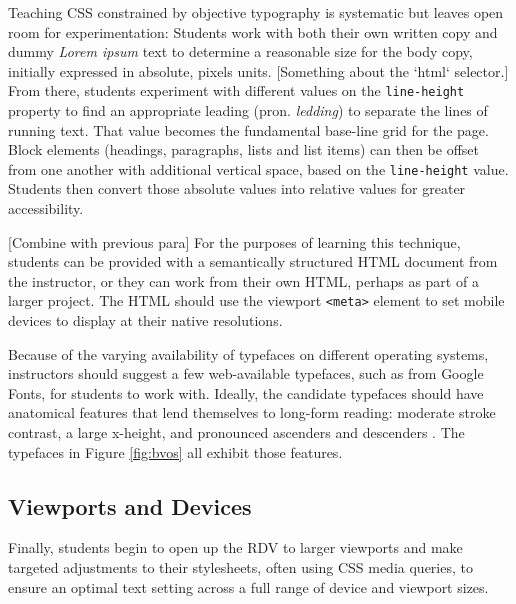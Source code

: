 \documentclass[sigplan,screen]{acmart}
\begin{document}
Teaching CSS constrained by objective typography is systematic but leaves open room for experimentation: Students work with both their own written copy and dummy {\itshape Lorem ipsum} text to determine a reasonable size for the body copy, initially expressed in absolute, pixels units. [Something about the `html` selector.] From there, students experiment with different values on the \verb|line-height| property to find an appropriate leading (pron. {\itshape ledding}) to separate the lines of running text. That value becomes the fundamental base-line grid for the page. Block elements (headings, paragraphs, lists and list items) can then be offset from one another with additional vertical space, based on the \verb|line-height| value. Students then convert those absolute values into relative values for greater accessibility.

[Combine with previous para] For the purposes of learning this technique, students can be provided with a semantically structured HTML document from the instructor, or they can work from their own HTML, perhaps as part of a larger project. The HTML should use the viewport \verb|<meta>| element to set mobile devices to display at their native resolutions.

Because of the varying availability of typefaces on different operating systems, instructors should suggest a few web-available typefaces, such as from Google Fonts, for students to work with. Ideally, the candidate typefaces should have anatomical features that lend themselves to long-form reading: moderate stroke contrast, a large x-height, and pronounced ascenders and descenders \cite[p.~36]{jsm:owt}. The typefaces in Figure \ref{fig:bvos} all exhibit those features.

\subsection{Viewports and Devices}


Finally, students begin to open up the RDV to larger viewports and make targeted adjustments to their stylesheets, often using CSS media queries, to ensure an optimal text setting across a full range of device and viewport sizes.
\end{document}
